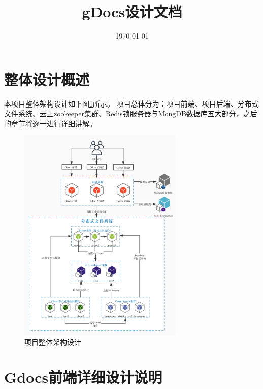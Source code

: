 \documentclass[UTF8]{ctexart}
\begin{document}
\graphicspath{{./figure/}}
\linespread{0.6} %
\setlength{\parskip}{0.5\baselineskip} %
\title{gDocs设计文档}

\date{\today}
\tableofcontents

\maketitle

\section{整体设计概述}
\par{本项目整体架构设计如下图\ref{fig:项目整体架构设计}所示。
项目总体分为：项目前端、项目后端、分布式文件系统、云上zookeeper集群、Redis锁服务器与MongDB数据库五大部分，之后的章节将逐一进行详细讲解。}
\begin{figure}[h]
    \centering
    \includegraphics[width=0.7\textwidth, height=0.8\textwidth]{structure.jpg}
	\caption{项目整体架构设计}
	\label{fig:项目整体架构设计}
\end{figure}

\section{Gdocs前端详细设计说明}
\end{document}
